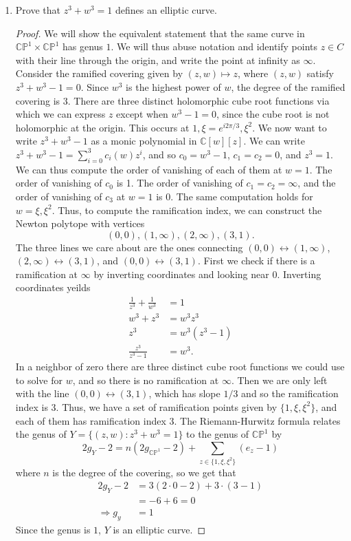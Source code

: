 \documentclass{article}
\begin{document}
\begin{enumerate}
	\item Prove that $z^3+w^3 = 1$ defines an elliptic curve.
	\begin{proof}
	We will show the equivalent statement that the same curve in $\mathbb{CP}^1\times \mathbb{CP}^1$
	has genus $1$.
	We will thus abuse notation and identify points $z \in C$ with their line through the origin,
	and write the point at infinity as $\infty$.
	Consider the ramified covering given by $(z,w) \mapsto z$, where $(z,w)$ satisfy
	$z^3+w^3 -1 = 0$. Since $w^3$ is the highest power of $w$, the degree of the ramified covering is $3$.
	There are three distinct holomorphic cube root functions via which we can express $z$ except when 
	$w^3-1 = 0$, since the cube root is not holomorphic at the origin. This occurs at $1, \xi=e^{i 2\pi/3}, \xi^2$.
	We now want to write $z^3+w^3-1$ as a monic polynomial in $\mathbb{C}[w][z]$.
	We can write $z^3 + w^3-1 = \sum_{i=0}^3 c_i(w) z^i$, and so $c_0 = w^3-1$, $c_1=c_2=0$, and $z^3=1$.
	We can thus compute the order of vanishing of each of them at $w=1$.
	The order of vanishing of $c_0$ is 1. The order of vanishing of $c_1=c_2= \infty$, and the order of vanishing
	of $c_3$ at $w=1$ is 0.
	The same computation holds for $w=\xi, \xi^2$.
	Thus, to compute the ramification index, we can construct the Newton polytope with vertices 
	\[ (0,0), (1,\infty), (2,\infty), (3,1).\]
	The three lines we care about are the ones connecting $(0,0) \leftrightarrow (1,\infty)$, $(2,\infty) \leftrightarrow (3,1)$, and $(0,0) \leftrightarrow (3,1)$. 
	First we check if there is a ramification at $\infty$ by inverting coordinates and looking near $0$.
	Inverting coordinates yeilds
	\begin{align*}
		\frac{1}{z^3} + \frac1{w^3} &= 1\\
		w^3 + z^3 &= w^3z^3\\
		z^3 &= w^3(z^3-1)\\
		\frac{z^3}{z^3-1} &= w^3.
	\end{align*}
	In a neighbor of zero there are three distinct cube root functions we could use to solve for $w$, and so there
	is no ramification at $\infty$.
	Then we are only left with the line $(0,0) \leftrightarrow (3,1)$, which has slope $1/3$ and so the ramification
	index is $3$.
	Thus, we have a set of ramification points given by $\{1, \xi, \xi^2\}$, and each of them has ramification index $3$.
	The Riemann-Hurwitz formula relates the genus of $Y = \{(z,w):z^3+w^3=1\}$ to the genus of $\mathbb{CP}^1$
	by
	\[ 2 g_Y - 2 = n(2g_{\mathbb{CP}^1} - 2) + \sum_{z \in \{1, \xi, \xi^2\}} (e_{z} - 1)  \]
	where $n$ is the degree of the covering, so we get that 
	\begin{align*}
	2 g_Y - 2 &= 3(2 \cdot 0 - 2) + 3 \cdot (3-1) \\
	&= -6 + 6 = 0\\
	\Rightarrow g_y &= 1
	\end{align*}
	Since the genus is $1$, $Y$ is an elliptic curve.
	\end{proof}
	

\end{enumerate}
\end{document}
